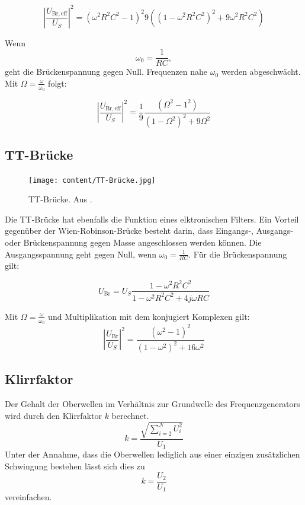 \begin{equation}
\left\lvert\frac{U_\mathrm{Br,eff}}{U_S}\right\rvert^2 = {(\omega^2 R^2 C^2 -1)^2}{9((1 - \omega^2 R^2 C^2)^2 + 9\omega^2 R^2 C^2)}
\end{equation}

Wenn
\begin{equation}
  \label{eqn:resonanz}
  \omega_0 = \frac{1}{RC},
\end{equation} geht die Brückenspannung gegen Null. Frequenzen nahe $\omega_0$ werden abgeschwächt.
Mit $\Omega = \frac{\omega}{\omega_0}$ folgt:

\begin{equation}
  \label{eqn:wr}
  \left\lvert \frac{U_\mathrm{Br,eff}}{U_S} \right\rvert^2 = \frac{1}{9} \frac {(\Omega^2 -1^2)}{(1 - \Omega^2)^2 + 9 \Omega^2}
\end{equation}

\subsection{TT-Brücke}
\begin{figure}
  \centering
  \texttt{[image: content/TT-Brücke.jpg]}
  \caption{TT-Brücke. Aus \cite{anleitung302}.}
  \label{fig:tt}
\end{figure}

Die TT-Brücke hat ebenfalls die Funktion eines elktronischen Filters. Ein Vorteil gegenüber der Wien-Robinson-Brücke besteht darin, dass Eingangs-, Ausgangs- oder Brückenspannung gegen Masse angeschlossen werden können.
Die Ausgangsspannung geht gegen Null, wenn $\omega_0 = \frac{1}{RC}$.
Für die Brückenspannung gilt:

\begin{equation}
  U_\mathrm{Br} = U_S \frac{1 - \omega^2 R^2 C^2}{1 - \omega^2 R^2 C^2 + 4j \omega R C}
\end{equation}

Mit $\Omega = \frac{\omega}{\omega_0}$ und Multiplikation mit dem konjugiert Komplexen gilt:
\begin{equation}
 \left\lvert\frac{U_\mathrm{Br}}{U_S}\right\rvert^2 = \frac{(\omega^2 - 1)^2}{(1 - \omega^2)^2 + 16\omega^2}
\end{equation}

\subsection{Klirrfaktor}
Der Gehalt der Oberwellen im Verhältnis zur Grundwelle des Frequenzgenerators wird durch den Klirrfaktor $k$ berechnet.
\begin{equation}
  \label{eqn:klirr1}
  k = \frac{\sqrt{\sum_{i=2}^N U_i^2}}{U_{1}}
\end{equation}
Unter der Annahme, dass die Oberwellen lediglich aus einer einzigen zusätzlichen Schwingung bestehen lässt sich dies zu
\begin{equation}
  \label{eqn:klirr2}
  k = \frac{U_2}{U_1}
\end{equation}
vereinfachen.
